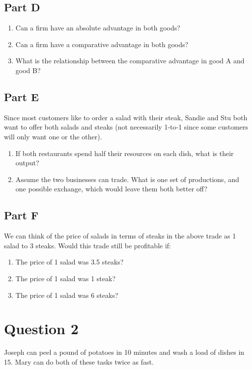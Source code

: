 \documentclass[12pt]{article}
\begin{document}
\subsection*{Part D}

\begin{enumerate}
    \item Can a firm have an absolute advantage in both goods?
    \item Can a firm have a comparative advantage in both goods?
    \item What is the relationship between the comparative advantage in good A and good B?
\end{enumerate}

\subsection*{Part E}
Since most customers like to order a salad with their steak, Sandie and Stu both want to offer both salads and steaks (not necessarily 1-to-1 since some customers will only want one or the other).

\begin{enumerate}
    \item If both restaurants spend half their resources on each dish, what is their output?
    \item Assume the two businesses can trade. What is one set of productions, and one possible exchange, which would leave them both better off?
\end{enumerate}

\subsection*{Part F}
We can think of the price of salads in terms of steaks in the above trade as 1 salad to 3 steaks. Would this trade still be profitable if:

\begin{enumerate}
    \item The price of 1 salad was 3.5 steaks?
    \item The price of 1 salad was 1 steak?
    \item The price of 1 salad was 6 steaks?
\end{enumerate}

\section*{Question 2}
Joseph can peel a pound of potatoes in 10 minutes and wash a load of dishes in 15. Mary can do both of these tasks twice as fast. 
\end{document}
